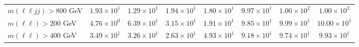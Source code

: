 \begin{table}[htp]
{\begin{tabular}{l | c c c c | c c c}
      $m(\ell\ell jj) > 800$ GeV & $1.93 \times 10^{1}$ & $1.29 \times 10^{1}$ & $1.94 \times 10^{1}$ & $1.80 \times 10^{1}$ & $9.97 \times 10^{1}$ & $1.00 \times 10^{2}$ & $1.00 \times 10^{2}$ \\
      $m(\ell\ell) > 200$ GeV & $4.76 \times 10^{0}$ & $6.39 \times 10^{1}$ & $3.15 \times 10^{1}$ & $1.91 \times 10^{1}$ & $9.85 \times 10^{1}$ & $9.99 \times 10^{1}$ & $10.00 \times 10^{1}$ \\
      $m(\ell\ell) > 400$ GeV & $3.49 \times 10^{1}$ & $3.26 \times 10^{1}$ & $2.63 \times 10^{1}$ & $4.93 \times 10^{1}$ & $9.18 \times 10^{1}$ & $9.74 \times 10^{1}$ & $9.93 \times 10^{1}$ \\
      \hline
    \end{tabular}
  }
\end{table}
